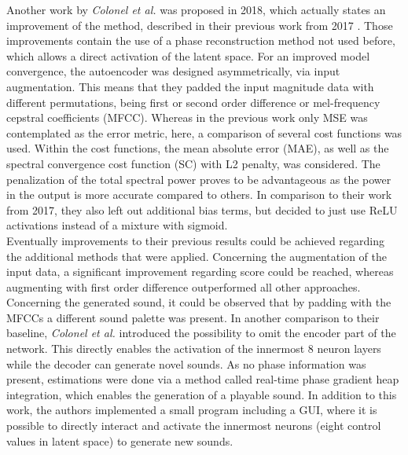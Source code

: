 \newpage
Another work by \textit{Colonel et al.} was proposed in 2018, which actually states an improvement of the method, described in their previous work from 2017 \cite{colonel2018autoencoding}. Those improvements contain the use of a phase reconstruction method not used before, which allows a direct activation of the latent space. For an improved model convergence, the autoencoder was designed asymmetrically, via input augmentation. This means that they padded the input magnitude data with different permutations, being first or second order difference or mel-frequency cepstral coefficients (MFCC). Whereas in the previous work only MSE was contemplated as the error metric, here, a comparison of several cost functions was used. Within the cost functions, the mean absolute error (MAE), as well as the spectral convergence cost function (SC) with L2 penalty, was considered. The penalization of the total spectral power proves to be advantageous as the power in the output is more accurate compared to others. In comparison to their work from 2017, they also left out additional bias terms, but decided to just use ReLU activations instead of a mixture with sigmoid.\\
Eventually improvements to their previous results could be achieved regarding the additional methods that were applied. Concerning the augmentation of the input data, a significant improvement regarding score could be reached, whereas augmenting with first order difference outperformed all other approaches. Concerning the generated sound, it could be observed that by padding with the MFCCs a different sound palette was present. In another comparison to their baseline, \textit{Colonel et al.} introduced the possibility to omit the encoder part of the network. This directly enables the activation of the innermost 8 neuron layers while the decoder can generate novel sounds. As no phase information was present, estimations were done via a method called real-time phase gradient heap integration, which enables the generation of a playable sound. In addition to this work, the authors implemented a small program including a GUI, where it is possible to directly interact and activate the innermost neurons (eight control values in latent space) to generate new sounds.

